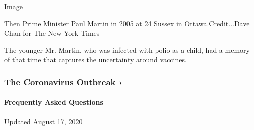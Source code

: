 Image

Then Prime Minister Paul Martin in 2005 at 24 Sussex in
Ottawa.Credit...Dave Chan for The New York Times

The younger Mr. Martin, who was infected with polio as a child, had a
memory of that time that captures the uncertainty around vaccines.

\href{https://www.nytimes3xbfgragh.onion/news-event/coronavirus?action=click\&pgtype=Article\&state=default\&region=MAIN_CONTENT_3\&context=storylines_faq}{}

\hypertarget{the-coronavirus-outbreak-}{%
\subsubsection{The Coronavirus Outbreak
›}\label{the-coronavirus-outbreak-}}

\hypertarget{frequently-asked-questions}{%
\paragraph{Frequently Asked
Questions}\label{frequently-asked-questions}}

Updated August 17, 2020

